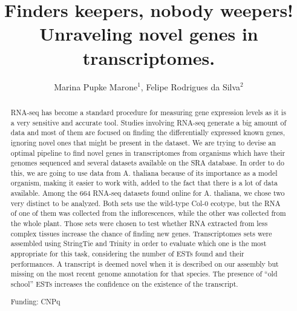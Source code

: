 \documentclass[twoside]{article}
\title{\vspace{-15mm}\fontsize{24pt}{10pt}\selectfont\textbf{Finders keepers, nobody weepers! Unraveling novel genes in transcriptomes.}} %
\author{Marina Pupke Marone$^1$, Felipe Rodrigues da Silva$^2$}
\affil{1 INSTITUTE OF BIOLOGY, UNICAMP\\ 2 EMBRAPA INFORM\'ATICA AGROPECU\'ARIA\\ }
\date{}
\begin{document}
\maketitle %

\thispagestyle{fancy} %


\begin{abstract}
RNA-seq has become a standard procedure for measuring gene expression levels as it is a very sensitive and accurate tool. Studies involving RNA-seq generate a big amount of data and most of them are focused on finding the differentially expressed known genes, ignoring novel ones that might be present in the dataset. 
We are trying to devise an optimal pipeline to find novel genes in transcriptomes from organisms which have their genomes sequenced and several datasets available on the SRA database. In order to do this, we are going to use data from A. thaliana because of its importance as a model organism, making it easier to work with, added to the fact that there is a lot of data available. Among the 664 RNA-seq datasets found online for A. thaliana, we chose two very distinct to be analyzed. Both sets use the wild-type Col-0 ecotype, but the RNA of one of them was collected from the inflorescences, while the other was collected from the whole plant. Those sets were chosen to test whether RNA extracted from less complex tissues increase the chance of finding new genes. 
Transcriptomes sets were assembled using StringTie and Trinity in order to evaluate which one is the most appropriate for this task, considering the number of ESTs found and their performances. A transcript is deemed novel when it is described on our assembly but missing on the most recent genome annotation for that species. The presence of ``old school'' ESTs increases the confidence on the existence of the transcript.

Funding: CNPq
\end{abstract}
\end{document}
